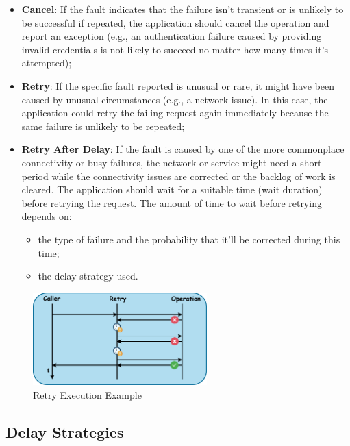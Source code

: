 \begin{itemize}
    \item \textbf{Cancel}: If the fault indicates that the failure isn't transient or is unlikely to be successful if repeated, the application should cancel the operation and report an exception (e.g., an authentication failure caused by providing invalid credentials is not likely to succeed no matter how many times it's attempted);
    \item \textbf{Retry}: If the specific fault reported is unusual or rare, it might have been caused by unusual circumstances (e.g., a network issue).
    In this case, the application could retry the failing request again immediately because the same failure is unlikely to be repeated;
    \item \textbf{Retry After Delay}: If the fault is caused by one of the more commonplace connectivity or busy failures, the network or service might need a short period while the connectivity issues are corrected or the backlog of work is cleared.
    The application should wait for a suitable time (wait duration) before retrying the request.
    The amount of time to wait before retrying depends on:
    \begin{itemize}
        \item the type of failure and the probability that it'll be corrected during this time;
        \item the delay strategy used.
    \end{itemize}
\end{itemize}

\begin{figure}[!htb]
    \centering
    \includegraphics[width=0.6\textwidth]{../figures/04_retry-execution-example}
    \caption{Retry Execution Example}
    \label{fig:retry-execution-example}
\end{figure}

\subsection{Delay Strategies}\label{subsec:retry-delay-strategies}

